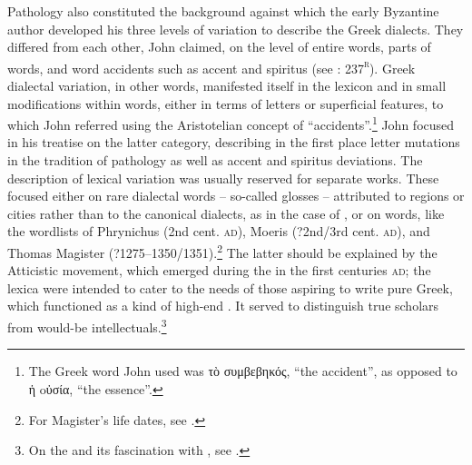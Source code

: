 Pathology also constituted the background against which the early Byzantine author  developed his three levels of variation to describe the Greek dialects. They differed from each other, John claimed, on the level of entire words, parts of words, and word accidents such as accent and spiritus (see \citealt{Manutius1496Thesaurus}: 237\textsc{\textsuperscript{r}}). Greek dialectal variation, in other words, manifested itself in the lexicon and in small modifications within words, either in terms of letters or superficial features, to which John referred using the Aristotelian concept of “accidents”.\footnote{The Greek word John used was τὸ συμβεβηκός, “the accident”, as opposed to ἡ oὐσία, “the essence”.} John focused in his treatise on the latter category, describing in the first place letter mutations in the tradition of pathology as well as accent and spiritus deviations. The description of lexical variation was usually reserved for separate works. These focused either on rare dialectal words – so-called glosses – attributed to regions or cities rather than to the canonical dialects, as in the case of , or on  words, like the wordlists of Phrynichus (2nd cent. \textsc{ad}), Moeris (?2nd/3rd cent. \textsc{ad}), and Thomas Magister (?1275–1350/1351).\footnote{{For Magister’s life dates, see \citet[417]{Baloglou1998}.}} The latter should be explained by the Atticistic movement, which emerged during the  in the first centuries \textsc{ad}; the lexica were intended to cater to the needs of those aspiring to write pure  Greek, which functioned as a kind of high-end . It served to distinguish true scholars from would-be intellectuals.\footnote{On the  and its fascination with , see \citet{Whitmarsh2005}.}



